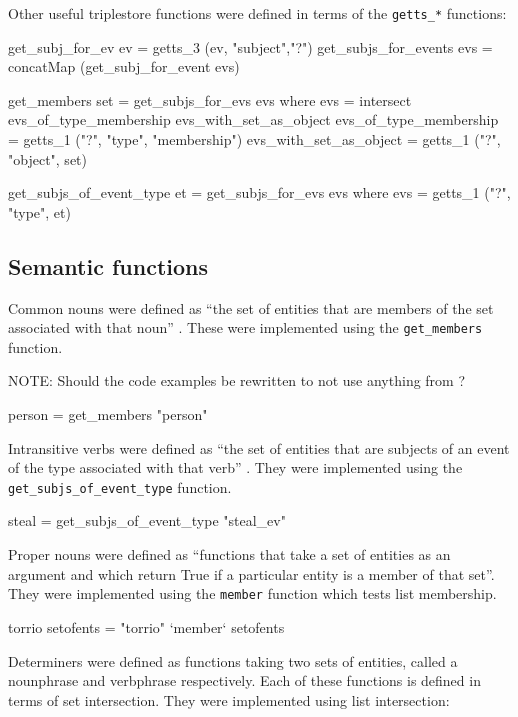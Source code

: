 \documentclass[../main.tex]{subfiles}
\begin{document}
Other useful triplestore functions were defined in terms of the \texttt{getts\_*}
functions:

\begin{code}
	get_subj_for_ev ev       = getts_3 (ev,  "subject","?")
	get_subjs_for_events evs = concatMap (get_subj_for_event evs)
	
	get_members set = get_subjs_for_evs evs
	where
		evs = intersect evs_of_type_membership evs_with_set_as_object
		evs_of_type_membership   = getts_1 ("?", "type", "membership")
		evs_with_set_as_object   = getts_1 ("?",  "object",  set)
		
	get_subjs_of_event_type et  = get_subjs_for_evs evs
	where
		evs = getts_1 ("?",  "type",  et)
\end{code}

\subsection{Semantic functions}

Common nouns were defined as ``the set of entities that are members of the set associated with that noun'' \cite{frost2014denotational}.
These were implemented using the \texttt{get\_members} function.

NOTE: Should the code examples be rewritten to not use anything from \cite{frost2014denotational}?
\begin{code}
	person = get_members "person"
\end{code}

Intransitive verbs were defined as ``the set of entities that are subjects of an event of the type associated with that verb'' \cite{frost2014denotational}.
They were implemented using the \texttt{get\_subjs\_of\_event\_type} function.

\begin{code}
	steal = get_subjs_of_event_type "steal_ev"
\end{code}

Proper nouns were defined as ``functions that take a set of entities as an
argument and which return True if a particular entity is a member of that
set''\cite{frost2014denotational}.  They were implemented using the
\texttt{member} function which tests list membership.

\begin{code}
	torrio setofents  = "torrio" `member` setofents
\end{code}

Determiners were defined as functions taking two sets of entities, called
a nounphrase and verbphrase respectively.  Each of these functions
is defined in terms of set intersection.  They were implemented using
list intersection:
\end{document}
